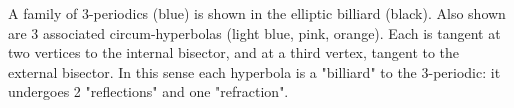 A family of 3-periodics (blue) is shown in the elliptic billiard (black). Also shown are 3 associated circum-hyperbolas (light blue, pink, orange). Each is tangent at two vertices to the internal bisector, and at a third vertex, tangent to the external bisector. In this sense each hyperbola is a "billiard" to the 3-periodic: it undergoes 2 "reflections" and one "refraction".